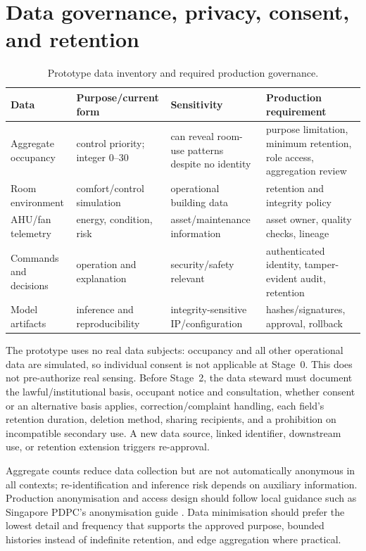 \section{Data governance, privacy, consent, and retention}
\begin{table}[H]
\centering
\caption{Prototype data inventory and required production governance.}
\begin{tabularx}{\textwidth}{L{0.20\textwidth}Y Y Y}
\toprule
Data & Purpose/current form & Sensitivity & Production requirement\\
\midrule
Aggregate occupancy & control priority; integer 0--30 & can reveal room-use patterns despite no identity & purpose limitation, minimum retention, role access, aggregation review\\
Room environment & comfort/control simulation & operational building data & retention and integrity policy\\
AHU/fan telemetry & energy, condition, risk & asset/maintenance information & asset owner, quality checks, lineage\\
Commands and decisions & operation and explanation & security/safety relevant & authenticated identity, tamper-evident audit, retention\\
Model artifacts & inference and reproducibility & integrity-sensitive IP/configuration & hashes/signatures, approval, rollback\\
\bottomrule
\end{tabularx}
\end{table}
The prototype uses no real data subjects: occupancy and all other operational data are simulated, so individual consent is not applicable at Stage~0. This does not pre-authorize real sensing. Before Stage~2, the data steward must document the lawful/institutional basis, occupant notice and consultation, whether consent or an alternative basis applies, correction/complaint handling, each field's retention duration, deletion method, sharing recipients, and a prohibition on incompatible secondary use. A new data source, linked identifier, downstream use, or retention extension triggers re-approval.

Aggregate counts reduce data collection but are not automatically anonymous in all contexts; re-identification and inference risk depends on auxiliary information. Production anonymisation and access design should follow local guidance such as Singapore PDPC's anonymisation guide \citep{pdpc2022anon}. Data minimisation should prefer the lowest detail and frequency that supports the approved purpose, bounded histories instead of indefinite retention, and edge aggregation where practical.

